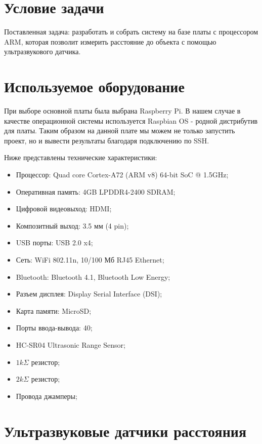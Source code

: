 \documentclass[a4paper, 14pt]{article}
\begin{document}
\large
\tableofcontents
\newpage

\section{Условие задачи}

Поставленная задача: разработать и собрать систему на базе платы с процессором ARM, которая позволит измерить расстояние до объекта с помощью ультразвукового датчика.

\newpage
\section{Используемое оборудование}

При выборе основной платы была выбрана Raspberry Pi. В нашем случае в качестве операционной системы используется Raspbian OS - родной дистрибутив для платы. Таким образом на данной плате мы можем не только запустить проект, но и вывести результаты благодаря подключению по SSH.

Ниже представлены технические характеристики:

\begin{itemize}
    \item Процессор: Quad core Cortex-A72 (ARM v8) 64-bit SoC @ 1.5GHz;
    \item Оперативная память: 4GB LPDDR4-2400 SDRAM;
    \item Цифровой видеовыход: HDMI;
    \item Композитный выход: 3.5 мм (4 pin);
    \item USB порты: USB 2.0 x4;
    \item Сеть: WiFi 802.11n, 10/100 Мб RJ45 Ethernet;
    \item Bluetooth: Bluetooth 4.1, Bluetooth Low Energy;
    \item Разъем дисплея: Display Serial Interface (DSI);
    \item Карта памяти: MicroSD;
    \item Порты ввода-вывода: 40;
    \item HC-SR04 Ultrasonic Range Sensor;
    \item $1k\Sigma$ резистор;
    \item $2k\Sigma$ резистор;
    \item Провода джамперы;
\end{itemize}

\newpage
\section{Ультразвуковые датчики расстояния}
\end{document}
